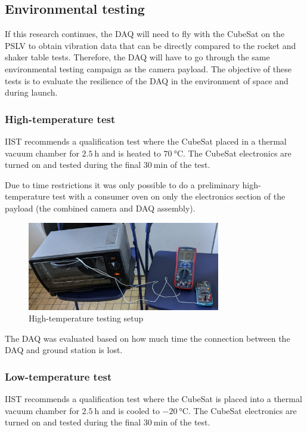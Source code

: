 \documentclass[a4paper,11pt]{article}
\begin{document}
\subsection{Environmental testing}

If this research continues, the DAQ will need to fly with the CubeSat on the PSLV to obtain vibration data that can be directly compared to the rocket and shaker table tests. Therefore, the DAQ will have to go through the same environmental testing campaign as the camera payload. The objective of these tests is to evaluate the resilience of the DAQ in the environment of space and during launch.

\subsubsection{High-temperature test}
\label{sec:htemp-test-framework}
IIST recommends a qualification test where the CubeSat placed in a thermal vacuum chamber for $\SI{2.5}{\hour}$ and is heated to $\SI{70}{\degreeCelsius}$. The CubeSat electronics are turned on and tested during the final $\SI{30}{\minute}$ of the test.

Due to time restrictions it was only possible to do a preliminary high-temperature test with a consumer oven on only the electronics section of the payload (the combined camera and DAQ assembly).

\begin{figure}[H]
  \centering
  \includegraphics[width=0.75\textwidth]{images/oven_test.jpg}
  \caption{High-temperature testing setup}
  \label{fig:temperature-testing-oven}
\end{figure}

The DAQ was evaluated based on how much time the connection between the DAQ and ground station is lost.

\subsubsection{Low-temperature test}
\label{sec:ltemp-test-framework}
IIST recommends a qualification test where the CubeSat is placed into a thermal vacuum chamber for $\SI{2.5}{\hour}$ and is cooled to $\SI{-20}{\degreeCelsius}$. The CubeSat electronics are turned on and tested during the final $\SI{30}{\minute}$ of the test.
\end{document}
